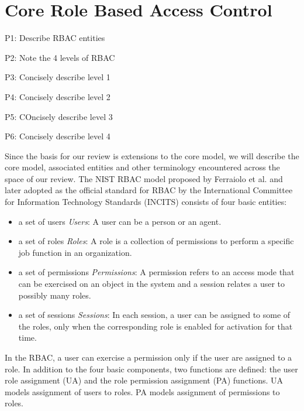 \section{Core Role Based Access Control} \label{sec:core-rbac}

P1: Describe RBAC entities

P2: Note the 4 levels of RBAC

P3: Concisely describe level 1

P4: Concisely describe level 2

P5: COncisely describe level 3

P6: Concisely describe level 4


Since the basis for our review is extensions to the core model, we will describe the core model, associated entities and other terminology encountered across the space of our review.  The NIST RBAC model proposed by Ferraiolo et al. and later adopted as the official standard for RBAC by the International Committee for Information Technology Standards (INCITS) consists of four basic entities:

\begin{itemize}
\item a set of users \emph{Users}: A user can be a person or an agent.
\item  a set of roles \emph{Roles}: A role is a collection of permissions to perform a specific job function in an organization.
\item a set of permissions \emph{Permissions}: A permission refers to an access mode that can be exercised on an object in the system and a session relates a user to possibly many roles.
\item a set of sessions \emph{Sessions}: In each session, a user can be assigned to some of the roles, only when the corresponding role is enabled for activation for that time.		
\end{itemize}

In the RBAC, a user can exercise a permission only if the user are assigned to a role.
In addition to the four basic components, two functions are defined:
the user role assignment (UA) and the role
permission assignment (PA) functions.
UA models assignment of users to roles.
PA models assignment of permissions to roles.



